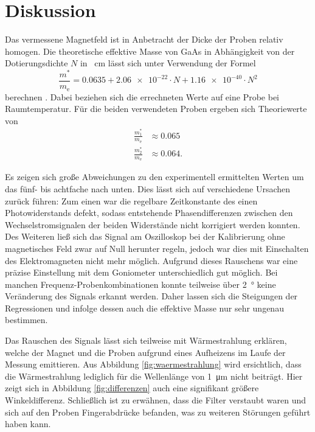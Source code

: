 \newpage
\section{Diskussion}
\label{sec:Diskussion}

Das vermessene Magnetfeld ist in Anbetracht der Dicke der Proben relativ
homogen.
Die theoretische effektive Masse von GaAs in Abhängigkeit von der Dotierungsdichte
$N$ in \si{\centi\meter} lässt sich unter Verwendung der
Formel
\begin{equation*}
  \frac{m^*}{m_\text{e}} =
  \num{0.0635} + \num{2.06e-22} \cdot N + \num{1.16e-40} \cdot N^2
  \label{eqn:Theoriewert}
\end{equation*}
berechnen \cite[7]{Nakwaski}. Dabei beziehen sich die errechneten Werte auf eine
Probe bei Raumtemperatur.
Für die beiden verwendeten Proben ergeben sich Theoriewerte von
\begin{align*}
  \frac{m^*_1}{m_\text{e}} &\approx \num{0.065} \\
  \frac{m^*_2}{m_\text{e}} &\approx \num{0.064}.
\end{align*}

Es zeigen sich große Abweichungen zu den experimentell ermittelten
Werten um das fünf- bis achtfache nach unten.
Dies lässt sich auf verschiedene Ursachen zurück führen:
Zum einen war die regelbare Zeitkonstante des einen Photowiderstands
defekt, sodass entstehende Phasendifferenzen zwischen den
Wechselstromsignalen der beiden Widerstände nicht korrigiert werden konnten.
Des Weiteren ließ sich das Signal am Oszilloskop bei der Kalibrierung ohne
magnetisches Feld zwar auf Null herunter regeln, jedoch war dies mit
Einschalten des Elektromagneten nicht mehr möglich.
Aufgrund dieses Rauschens war eine präzise Einstellung mit dem Goniometer
unterschiedlich gut möglich. Bei manchen Frequenz-Probenkombinationen
konnte teilweise über \SI{2}{\degree} keine Veränderung des Signals
erkannt werden. Daher lassen sich die Steigungen der Regressionen
und infolge dessen auch die effektive Masse nur sehr ungenau bestimmen.

Das Rauschen des Signals lässt sich teilweise mit Wärmestrahlung erklären,
welche der Magnet und die Proben aufgrund eines Aufheizens im Laufe
der Messung emittieren. Aus Abbildung \ref{fig:waermestrahlung}
wird ersichtlich, dass die Wärmestrahlung lediglich für die
Wellenlänge von \SI{1}{\micro\meter} nicht beiträgt.
Hier zeigt sich in Abbildung \ref{fig:differenzen} auch
eine signifikant größere Winkeldifferenz.
Schließlich ist zu erwähnen, dass die Filter verstaubt waren und sich
auf den Proben Fingerabdrücke befanden, was zu weiteren Störungen geführt
haben kann.


